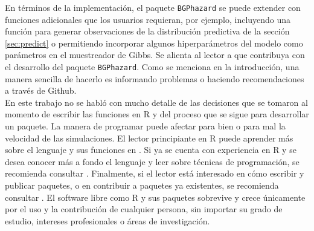 \documentclass[11pt,a4paper]{article}
\begin{document}
En términos de la implementación, el paquete \texttt{BGPhazard} se puede extender con funciones adicionales que los usuarios requieran, por ejemplo, incluyendo una función para generar observaciones de la distribución predictiva de la sección \ref{sec:predict} o permitiendo incorporar algunos hiperparámetros del modelo como parámetros en el muestreador de Gibbs. Se alienta al lector a que contribuya con el desarrollo del paquete \texttt{BGPhazard}. Como se menciona en la introducción, una manera sencilla de hacerlo es informando problemas o haciendo recomendaciones a través de Github.\\

En este trabajo no se habló con mucho detalle de las decisiones que se tomaron al momento de escribir las funciones en R y del proceso que se sigue para desarrollar un paquete. La manera de programar puede afectar para bien o para mal la velocidad de las simulaciones. El lector principiante en R puede aprender más sobre el lenguaje y sus funciones en \citet{rfordatascience}. Si ya se cuenta con experiencia en R y se desea conocer más a fondo el lenguaje y leer sobre técnicas de programación, se recomienda consultar \citet{advanced_r}. Finalmente, si el lector está interesado en cómo escribir y publicar paquetes, o en contribuir a paquetes ya existentes, se recomienda consultar \citet{rpackages}. El software libre como R y sus paquetes sobrevive y crece únicamente por el uso y la contribución de cualquier persona, sin importar su grado de estudio, intereses profesionales o áreas de investigación.\\

\newpage
\end{document}

